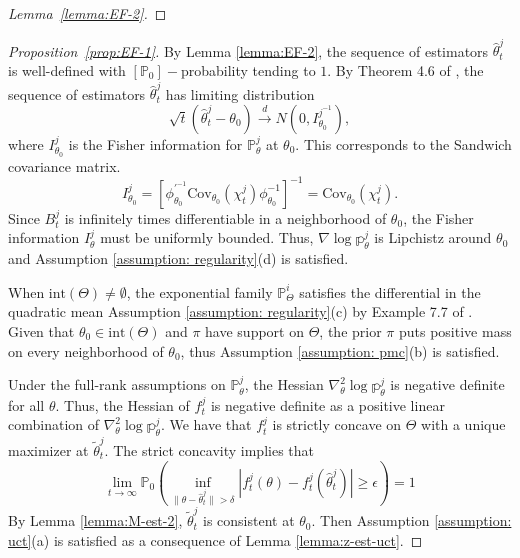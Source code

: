 \documentclass[twoside,11pt]{article}
\numberwithin{equation}{section}
\newcommand\bP{\mathbb{P}}
\newcommand\bp{\mathbb{p}}
\newcommand{\dto}{\stackrel{d}{\to}}
\begin{document}
{\begin{proof}[Lemma~\ref{lemma:EF-2}]
\end{proof}
\begin{proof}[Proposition~\ref{prop:EF-1}]
By Lemma \eqref{lemma:EF-2}, the sequence of estimators $\hat \theta_t^j$ is well-defined with $[\bP_0]-$probability tending to $1$. By Theorem 4.6 of \cite{VanderVaart2000}, the sequence of estimators $\hat \theta_t^j$ has limiting distribution
\begin{equation*}
    \sqrt{t} (\hat \theta_t^j - \theta_0) \dto N(0, I_{\theta_0}^{j^{-1}}), 
\end{equation*}
where $I_{\theta_0}^j$ is the Fisher information for $\bP_\theta^j$ at $\theta_0$.  This corresponds to the Sandwich covariance matrix. 
\begin{equation*}
    I_{\theta_0}^j = \left[ \phi^{'^{-1}}_{\theta_0} \text{Cov}_{\theta_0}(\chi_t^j) \phi^{-1}_{\theta_0} \right]^{-1}  = \text{Cov}_{\theta_0}(\chi_t^j). 
\end{equation*}
Since $B_t^j$ is infinitely times differentiable in a neighborhood of $\theta_0$, the Fisher information $I_{\theta}^j$ must be uniformly bounded. Thus, $\nabla \log \bp_\theta^j$ is Lipchistz around $\theta_0$ and Assumption \ref{assumption: regularity}(d) is satisfied. 

When $\text{int}(\Theta) \neq \emptyset$, the exponential family $\bP_\Theta^i$ satisfies the differential in the quadratic mean Assumption \ref{assumption: regularity}(c) by Example 7.7 of \cite{VanderVaart2000}. Given that $\theta_0 \in \text{int}(\Theta)$ and $\pi$ have support on $\Theta$, the prior $\pi$ puts positive mass on every neighborhood of $\theta_0$, thus Assumption \ref{assumption: pmc}(b) is satisfied.

Under the full-rank assumptions on $\bP_\theta^j$,  the Hessian $\nabla^2_\theta \log \bp_\theta^j$ is negative definite for all $\theta$. Thus, the Hessian of $f_t^j$ is negative definite as a positive linear combination of $\nabla^2_\theta \log \bp_\theta^j$. We have that $f_t^j$ is strictly concave on $\Theta$ with a unique maximizer at $\tilde \theta_t^j$. The strict concavity implies that 
\begin{equation*}
\lim_{t \to \infty} \bP_0(\inf_{\|\theta - \hat\theta_t^j\| > \delta}|f_t^j(\theta) - f_t^j(\hat\theta_t^j)| \geq \epsilon) = 1
\end{equation*}
By Lemma \ref{lemma:M-est-2}, $\tilde \theta_t^j$ is consistent at $\theta_0$. Then Assumption \ref{assumption: uct}(a) is satisfied as a consequence of  Lemma \ref{lemma:z-est-uct}.


\end{proof}}
\end{document}
